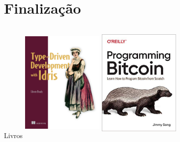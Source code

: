 \documentclass{beamer}
\begin{document}
\section{Finalização}

 \begin{frame}{Livros}
    \includegraphics[width=4cm, height=6cm]{TDD}
    \includegraphics[width=4cm, height=6cm]{ProgrammingBitcoin}
 \end{frame}
  
\end{document}
